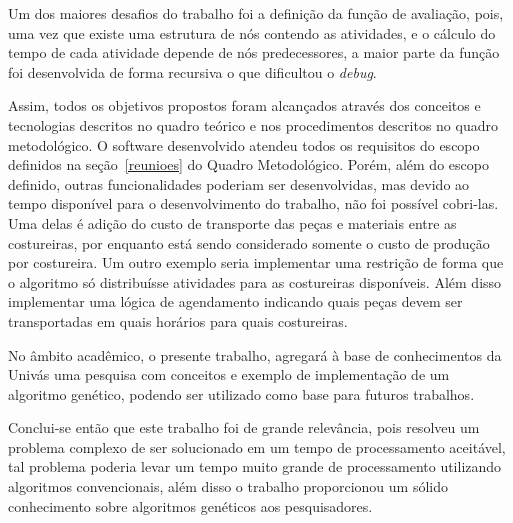 \par Um dos maiores desafios do trabalho foi a definição da função de avaliação, pois, 
uma vez que existe uma estrutura de nós contendo as atividades, e o cálculo do tempo de 
cada atividade depende de nós predecessores, a maior parte da função foi  
desenvolvida de forma recursiva o que dificultou o \textit{debug}.

\par Assim, todos os objetivos propostos foram alcançados através dos conceitos e tecnologias descritos no quadro teórico e
nos procedimentos descritos no quadro metodológico. O software desenvolvido atendeu todos os requisitos do escopo definidos 
na seção~\ref{reunioes} do Quadro Metodológico. Porém, além do escopo definido, outras funcionalidades poderiam ser desenvolvidas, 
mas devido ao tempo disponível para o desenvolvimento do trabalho, não foi possível cobri-las. Uma delas é adição do custo de 
transporte das peças e materiais entre as costureiras, por enquanto está sendo considerado somente o custo de produção por costureira. 
Um outro exemplo seria implementar uma restrição de forma que o algoritmo só distribuísse atividades para as costureiras disponíveis. 
Além disso  implementar uma lógica de agendamento indicando quais peças devem ser transportadas em quais horários para quais 
costureiras.

\par No âmbito acadêmico, o presente trabalho, agregará à base de conhecimentos da Univás uma pesquisa com conceitos e exemplo de
implementação de um algoritmo genético, podendo ser utilizado como base para futuros trabalhos.

\par Conclui-se então que este trabalho foi de grande relevância, pois resolveu um problema complexo de ser solucionado em um 
tempo de processamento aceitável, tal problema poderia levar um tempo muito grande de processamento utilizando algoritmos
convencionais, além disso o trabalho proporcionou um sólido conhecimento sobre algoritmos genéticos aos pesquisadores.



